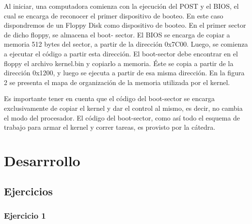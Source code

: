 \documentclass[a4paper]{article}
\begin{document}
Al iniciar, una computadora comienza con la ejecución del POST y el BIOS, el cual se
encarga de reconocer el primer dispositivo de booteo. En este caso dispondremos de un Floppy
Disk como dispositivo de booteo. En el primer sector de dicho floppy, se almacena el boot-
sector. El BIOS se encarga de copiar a memoria 512 bytes del sector, a partir de la dirección
0x7C00. Luego, se comienza a ejecutar el código a partir esta dirección. El boot-sector debe
encontrar en el floppy el archivo kernel.bin y copiarlo a memoria. Éste se copia a partir
de la dirección 0x1200, y luego se ejecuta a partir de esa misma dirección. En la figura 2 se
presenta el mapa de organización de la memoria utilizada por el kernel.

Es importante tener en cuenta que el código del boot-sector se encarga exclusivamente de
copiar el kernel y dar el control al mismo, es decir, no cambia el modo del procesador. El
código del boot-sector, como as\'i todo el esquema de trabajo para armar el kernel y correr
tareas, es provisto por la cátedra.

\section{Desarrrollo}

\subsection{Ejercicios}

\subsubsection{Ejercicio 1}
\end{document}
